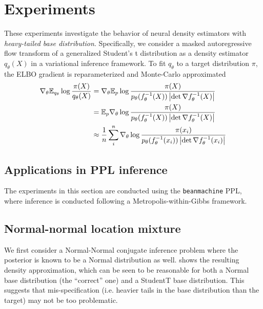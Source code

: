 \documentclass{scrartcl}
\theoremstyle{definition}
\begin{document}
\section{Experiments}

These experiments investigate the behavior of neural density estimators with
\emph{heavy-tailed base distribution}.
Specifically, we consider a masked autoregressive flow \cite{papamakarios2017masked}
transform of a generalized Student's t distribution as a density estimator $q_\theta(X)$
in a variational inference framework. To fit $q_\theta$ to a target distribution
$\pi$, the ELBO gradient is reparameterized and Monte-Carlo approximated
\begin{align*}
    \nabla_\theta \mathbb{E}_{q_\theta} \log \frac{\pi(X)}{q_\theta(X)}
     & = \nabla_\theta \mathbb{E}_p \log \frac{
        \pi(X)
    }{p_\theta(f_\theta^{-1}(X))
    \left\lvert \det \nabla f_\theta^{-1}(X) \right\rvert}    \\
     & = \mathbb{E}_p \nabla_\theta \log \frac{
        \pi(X)
    }{p_\theta(f_\theta^{-1}(X))
    \left\lvert \det \nabla f_\theta^{-1}(X) \right\rvert}    \\
     & \approx \frac{1}{n} \sum_i^n \nabla_\theta \log \frac{
        \pi(x_i)
    }{p_\theta(f_\theta^{-1}(x_i))
        \left\lvert \det \nabla f_\theta^{-1}(x_i) \right\rvert}
\end{align*}


\subsection{Applications in PPL inference}

The experiments in this section are conducted using the \texttt{beanmachine} PPL, where
inference is conducted following a Metropolis-within-Gibbs framework.

\subsection{Normal-normal location mixture}

We first consider a Normal-Normal conjugate inference problem where the posterior
is known to be a Normal distribution as well.
 shows the resulting density approximation, which can
be seen to be reasonable for both a Normal base distribution (the ``correct'' one)
and a StudentT base distribution. This suggests that mis-specification (i.e. heavier
tails in the base distribution than the target) may not be too problematic.
\end{document}
